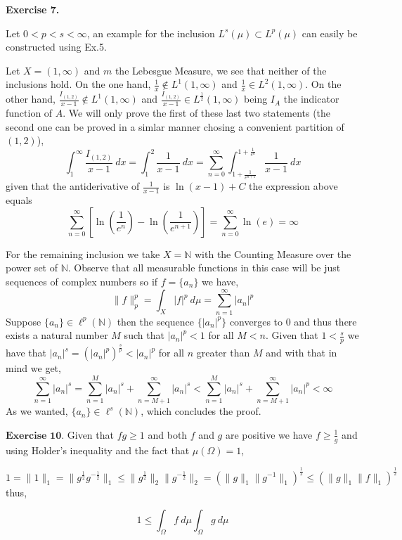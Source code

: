 \documentclass{article}
\begin{document}
\begin{exercise}\textbf{Exercise 7.}

    Let $0 < p < s < \infty$, an example for the inclusion $L^s \left(  \mu\right)  \subset L^p \left( \mu \right) $ can easily be constructed using Ex.5.

    Let $X = \left( 1, \infty \right) $ and $m$ the Lebesgue Measure, we see that neither of the inclusions hold. On the one hand, $\frac{1}{x} \notin L^1 \left( 1, \infty \right)$ and $\frac{1}{x} \in L^2 \left( 1, \infty \right) $. On the other hand, $\frac{I_{ \left( 1,2 \right) }}{ x-1} \notin L^1 \left( 1,\infty \right) $ and $\frac{I_{ \left( 1,2 \right) }}{x-1} \in L^{\frac{1}{2}} \left( 1,\infty \right) $ being $I_A$ the indicator function of $A$. We will only prove the first of these last two statements (the second one can be proved in a simlar manner chosing a convenient partition of $ \left( 1,2 \right) $),
    \[
        \int_{1}^{\infty}\frac{I_{ \left( 1,2 \right) }}{x-1} \: dx  = \int_{1}^{2} \frac{1}{x-1}\: dx = \sum_{n=0}^{\infty} \int_{1+\frac{1}{e^{n+1}}}^{1+\frac{1}{e^n}} \frac{1}{x-1}\: dx 
    \]
    given that the antiderivative of $\frac{1}{x-1}$ is $\ln \left( x-1 \right) + C$ the expression above equals
    \[
        \sum_{n=0}^{\infty} \left [\ln \left( \frac{1}{e^n} \right)  - \ln \left( \frac{1}{e^{n+1}} \right) \right] = \sum_{n=0}^{\infty} \ln \left( e \right) = \infty 
    \]

    For the remaining inclusion we take $X = \mathbb{N}$ with the Counting Measure over the power set of $\mathbb{N}$. Observe that all measurable functions in this case will be just sequences of complex numbers so if $f=\{a_n\}$ we have,
    \[
        \|f\|_p^p = \int_X |f|^p\: d\mu = \sum_{n=1}^{\infty} |a_n|^p 
    \]
    Suppose $\{a_n\} \in \ell^p \left( \mathbb{N} \right)$ then the sequence $\{|a_n|^p\}$ converges to 0 and thus there exists a natural number $M$ such that $|a_n|^p < 1$ for all $M < n$. Given that $1 < \frac{s}{p}$ we have that $|a_n|^s = \left( |a_n|^p \right)^\frac{s}{p} < |a_n|^p$ for all $n$ greater than $M$ and with that in mind we get,
    \[
       \sum_{n=1}^{\infty} |a_n|^s = \sum_{n=1}^{M} |a_n|^s + \sum_{n=M+1}^{\infty} |a_n|^s < \sum_{n=1}^{M} |a_n|^s + \sum_{n=M+1}^{\infty} |a_n|^p < \infty  
    \]
    As we wanted, $\{a_n\} \in \ell ^s \left( \mathbb{N} \right) $, which concludes the proof.
\end{exercise}

\bigbreak

\begin{exercise}$\textbf{Exercise 10.}$
Given that $fg\ge1$ and both $f$ and $g$ are positive we have $f \ge \frac{1}{g}$ and using Holder's inequality and the fact that $\mu\left(\Omega\right)=1$,

\[
    1 = \|1\|_1 = \|g^{\frac{1}{2}}g^{-\frac{1}{2}}\|_1 \le \|g^{\frac{1}{2}}\|_2 \|g^{-\frac{1}{2}}\|_2 =  \left( \|g\|_1 \|g^{-1}\|_1 \right) ^{\frac{1}{2}} \le \left(\|g\|_1 \|f\|_1 \right)^{\frac{1}{2}} 
\]
thus,

\[
    1 \le \int_\Omega f\: d\mu \int_\Omega g\: d\mu  
\]

\end{exercise}
\end{document}
